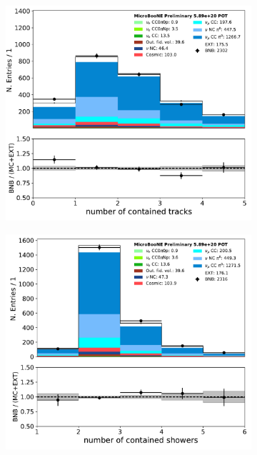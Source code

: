 \begin{figure}[H] 
\begin{center}
    \begin{subfigure}[b]{0.3\textwidth}
    \centering
    \includegraphics[width=1.00\textwidth]{pi0/nueselection/n_tracks_contained_03112020_ALL_scaled.pdf}
    \caption{}
    \end{subfigure}
    \begin{subfigure}[b]{0.3\textwidth}
    \centering
    \includegraphics[width=1.00\textwidth]{pi0/nueselection/n_showers_contained_03112020_ALL_scaled.pdf}

\end{subfigure}
\end{center}
\end{figure}
